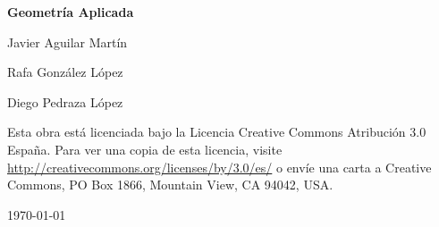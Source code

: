 \documentclass[twoside]{report}
\begin{document}
\begin{titlepage}
	\centering
	{\huge\bfseries Geometría Aplicada \par}
	\vspace{2cm}
	{\Large Javier Aguilar Martín\par}
	{\Large Rafa González López\par}
	{\Large Diego Pedraza López\par}
	\vspace{2.5cm}
	\vfill
	Esta obra está licenciada bajo la Licencia Creative Commons Atribución 3.0 España. Para ver una copia de esta licencia, visite \url{http://creativecommons.org/licenses/by/3.0/es/} o envíe una carta a Creative Commons, PO Box 1866, Mountain View, CA 94042, USA.

	{\large \today\par}
\end{titlepage}

\tableofcontents


\end{document}
